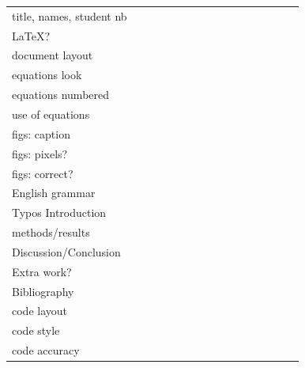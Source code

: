 \begin{tabular}{|p{5cm}|p{.35cm}|p{.35cm}|p{.35cm}|p{.35cm}|p{.35cm}|p{.35cm}|p{.35cm}|p{.35cm}|p{.35cm}|p{.35cm}|p{.35cm}|p{.35cm}|p{.35cm}|p{.35cm}|p{.35cm}|}
&&&&&&&&&&&&&&& \\
\hline
title, names, student nb &&&&&&&&&&&&&&& \\\hline
\LaTeX ? &&&&&&&&&&&&&&& \\\hline
document layout &&&&&&&&&&&&&&& \\\hline
equations look &&&&&&&&&&&&&&& \\\hline
equations numbered  &&&&&&&&&&&&&&& \\\hline
use of equations &&&&&&&&&&&&&&& \\\hline
figs: caption &&&&&&&&&&&&&&& \\\hline
figs: pixels? &&&&&&&&&&&&&&& \\\hline
figs: correct? &&&&&&&&&&&&&&& \\\hline
English grammar &&&&&&&&&&&&&&& \\\hline
Typos 
Introduction &&&&&&&&&&&&&&& \\\hline
methods/results &&&&&&&&&&&&&&& \\\hline
Discussion/Conclusion  &&&&&&&&&&&&&&& \\\hline
Extra work? &&&&&&&&&&&&&&& \\\hline
Bibliography &&&&&&&&&&&&&&& \\\hline
code layout &&&&&&&&&&&&&&& \\\hline 
code style &&&&&&&&&&&&&&& \\\hline
code accuracy &&&&&&&&&&&&&&& \\\hline
\end{tabular}

